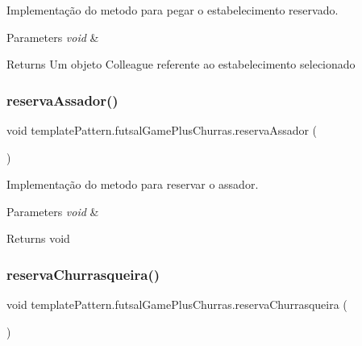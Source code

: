 Implementação do metodo para pegar o estabelecimento reservado. 


\begin{DoxyParams}{Parameters}
{\em void} & \\
\hline
\end{DoxyParams}
\begin{DoxyReturn}{Returns}
Um objeto Colleague referente ao estabelecimento selecionado 
\end{DoxyReturn}
\mbox{\label{classtemplate_pattern_1_1futsal_game_plus_churras_ae83ee85e357c5b99b6ea0f14feb6dd56}} 
\subsubsection{\texorpdfstring{reservaAssador()}{reservaAssador()}}
{\footnotesize\ttfamily void template\+Pattern.\+futsal\+Game\+Plus\+Churras.\+reserva\+Assador (\begin{DoxyParamCaption}{ }\end{DoxyParamCaption})}



Implementação do metodo para reservar o assador. 


\begin{DoxyParams}{Parameters}
{\em void} & \\
\hline
\end{DoxyParams}
\begin{DoxyReturn}{Returns}
void 
\end{DoxyReturn}
\mbox{\label{classtemplate_pattern_1_1futsal_game_plus_churras_a14273b7c06bd746caa7b176159d0fd80}} 
\subsubsection{\texorpdfstring{reservaChurrasqueira()}{reservaChurrasqueira()}}
{\footnotesize\ttfamily void template\+Pattern.\+futsal\+Game\+Plus\+Churras.\+reserva\+Churrasqueira (\begin{DoxyParamCaption}{ }\end{DoxyParamCaption})}




